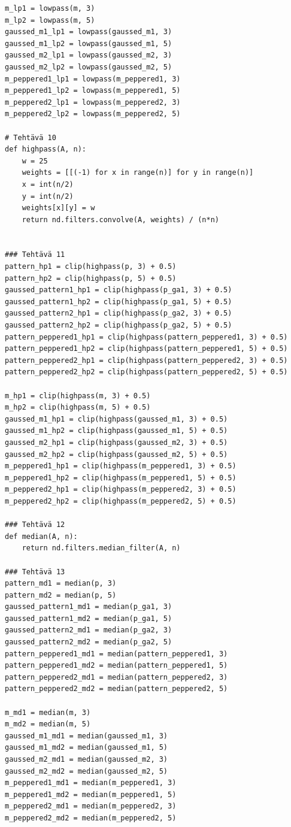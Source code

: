 \documentclass{article}
\begin{document}
\begin{verbatim}
m_lp1 = lowpass(m, 3)
m_lp2 = lowpass(m, 5)
gaussed_m1_lp1 = lowpass(gaussed_m1, 3)
gaussed_m1_lp2 = lowpass(gaussed_m1, 5)
gaussed_m2_lp1 = lowpass(gaussed_m2, 3)
gaussed_m2_lp2 = lowpass(gaussed_m2, 5)
m_peppered1_lp1 = lowpass(m_peppered1, 3) 
m_peppered1_lp2 = lowpass(m_peppered1, 5) 
m_peppered2_lp1 = lowpass(m_peppered2, 3) 
m_peppered2_lp2 = lowpass(m_peppered2, 5) 

# Tehtävä 10
def highpass(A, n):
    w = 25
    weights = [[(-1) for x in range(n)] for y in range(n)]
    x = int(n/2)
    y = int(n/2)
    weights[x][y] = w 
    return nd.filters.convolve(A, weights) / (n*n)


### Tehtävä 11
pattern_hp1 = clip(highpass(p, 3) + 0.5)
pattern_hp2 = clip(highpass(p, 5) + 0.5)
gaussed_pattern1_hp1 = clip(highpass(p_ga1, 3) + 0.5)
gaussed_pattern1_hp2 = clip(highpass(p_ga1, 5) + 0.5)
gaussed_pattern2_hp1 = clip(highpass(p_ga2, 3) + 0.5)
gaussed_pattern2_hp2 = clip(highpass(p_ga2, 5) + 0.5)
pattern_peppered1_hp1 = clip(highpass(pattern_peppered1, 3) + 0.5)
pattern_peppered1_hp2 = clip(highpass(pattern_peppered1, 5) + 0.5)
pattern_peppered2_hp1 = clip(highpass(pattern_peppered2, 3) + 0.5)
pattern_peppered2_hp2 = clip(highpass(pattern_peppered2, 5) + 0.5)

m_hp1 = clip(highpass(m, 3) + 0.5)
m_hp2 = clip(highpass(m, 5) + 0.5)
gaussed_m1_hp1 = clip(highpass(gaussed_m1, 3) + 0.5)
gaussed_m1_hp2 = clip(highpass(gaussed_m1, 5) + 0.5)
gaussed_m2_hp1 = clip(highpass(gaussed_m2, 3) + 0.5)
gaussed_m2_hp2 = clip(highpass(gaussed_m2, 5) + 0.5)
m_peppered1_hp1 = clip(highpass(m_peppered1, 3) + 0.5)
m_peppered1_hp2 = clip(highpass(m_peppered1, 5) + 0.5)
m_peppered2_hp1 = clip(highpass(m_peppered2, 3) + 0.5) 
m_peppered2_hp2 = clip(highpass(m_peppered2, 5) + 0.5) 

### Tehtävä 12
def median(A, n):
    return nd.filters.median_filter(A, n)

### Tehtävä 13
pattern_md1 = median(p, 3)
pattern_md2 = median(p, 5)
gaussed_pattern1_md1 = median(p_ga1, 3)
gaussed_pattern1_md2 = median(p_ga1, 5)
gaussed_pattern2_md1 = median(p_ga2, 3)
gaussed_pattern2_md2 = median(p_ga2, 5)
pattern_peppered1_md1 = median(pattern_peppered1, 3) 
pattern_peppered1_md2 = median(pattern_peppered1, 5) 
pattern_peppered2_md1 = median(pattern_peppered2, 3) 
pattern_peppered2_md2 = median(pattern_peppered2, 5) 

m_md1 = median(m, 3)
m_md2 = median(m, 5)
gaussed_m1_md1 = median(gaussed_m1, 3)
gaussed_m1_md2 = median(gaussed_m1, 5)
gaussed_m2_md1 = median(gaussed_m2, 3)
gaussed_m2_md2 = median(gaussed_m2, 5)
m_peppered1_md1 = median(m_peppered1, 3) 
m_peppered1_md2 = median(m_peppered1, 5) 
m_peppered2_md1 = median(m_peppered2, 3) 
m_peppered2_md2 = median(m_peppered2, 5) 


\end{verbatim}
\end{document}
